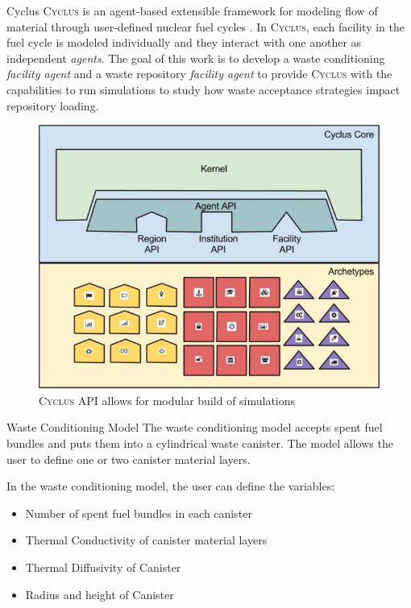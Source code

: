 \documentclass[final]{beamer}
\newlength{\onecolwid}
\newlength{\threecolwid}
\newcommand{\Cyclus}{\textsc{Cyclus}\xspace}%
\begin{document}
\begin{frame}[t]
\begin{columns}[t,totalwidth=\threecolwid]
\begin{column}{\onecolwid}
\begin{block}{Cyclus}
\Cyclus is an agent-based extensible framework for modeling flow of material 
through user-defined nuclear fuel cycles \cite{huff_fundamental_2016}. 
In \Cyclus, each facility in the fuel cycle is modeled individually 
and they interact with one another as independent \textit{agents}. 
The goal of this work is to develop a waste conditioning \textit{facility agent} 
and a waste repository \textit{facility agent} to provide \Cyclus with 
the capabilities to run simulations to study how waste acceptance 
strategies impact repository loading. 
\begin{figure}
	\includegraphics[width=0.9\linewidth]{Cyclus_graph}
	\caption{\Cyclus API allows for modular build of simulations \cite{huff_fundamental_2016}}
\end{figure}

\end{block}

\begin{block}{Waste Conditioning Model}
	The waste conditioning model accepts spent fuel bundles and puts them into a cylindrical
	waste canister. The model allows the user to define one or two canister material layers. 
	
	In the waste conditioning model, the user can define the variables:  
		\begin{itemize}
			\item Number of spent fuel bundles in each canister 
			\item Thermal Conductivity of canister material layers 
			\item Thermal Diffusivity of Canister 
			\item Radius and height of Canister
		\end{itemize}
	

\end{block}
\end{column}
\end{columns}
\end{frame}
\end{document}
